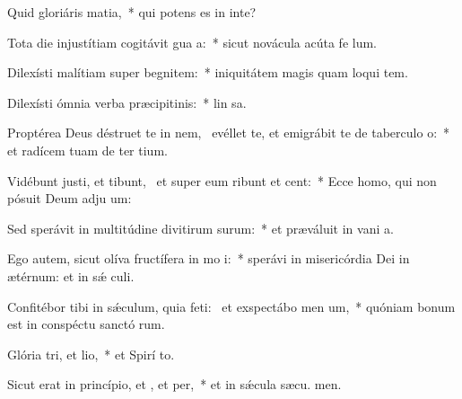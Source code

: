 \item Quid gloriáris  matia,~* qui potens es in inte?
\item Tota die injustítiam cogitávit gua a:~* sicut novácula acúta fe lum.
\item Dilexísti malítiam super begnitem:~* iniquitátem magis quam loqui tem.
\item Dilexísti ómnia verba præcipitinis:~* lin sa.
\item Proptérea Deus déstruet te in nem,~\pscross{} evéllet te, et emigrábit te de taberculo o:~* et radícem tuam de ter tium.
\item Vidébunt justi, et tibunt,~\pscross{} et super eum ribunt et cent:~* Ecce homo, qui non pósuit Deum adju um:
\item Sed sperávit in multitúdine divitirum surum:~* et præváluit in vani a.
\item Ego autem, sicut olíva fructífera in mo i:~* sperávi in misericórdia Dei in ætérnum: et in sǽ culi.
\item Confitébor tibi in sǽculum, quia feti:~\pscross{} et exspectábo men um,~* quóniam bonum est in conspéctu sanctó rum.
\item Glória tri, et lio,~* et Spirí to.
\item Sicut erat in princípio, et , et per,~* et in sǽcula sæcu. men.
